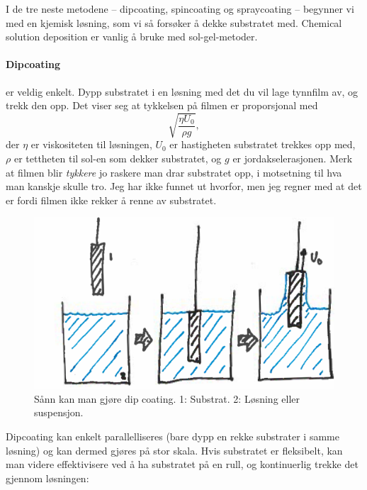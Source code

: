 I de tre neste metodene -- dipcoating, spincoating og spraycoating -- begynner vi med en kjemisk løsning, som vi så forsøker å dekke substratet med. Chemical solution deposition er vanlig å bruke med sol-gel-metoder. 

\paragraph{Dipcoating} er veldig enkelt. Dypp substratet i en løsning med det du vil lage tynnfilm av, og trekk den opp. Det viser seg at tykkelsen på filmen er proporsjonal med 
\begin{equation}
	\sqrt{\frac{\eta U_0}{\rho g}},
\end{equation}
 der $\eta$ er viskositeten til løsningen, $U_0$ er hastigheten substratet trekkes opp med, $\rho$ er tettheten til sol-en som dekker substratet, og $g$ er jordakselerasjonen. Merk at filmen blir \emph{tykkere} jo raskere man drar substratet opp, i motsetning til hva man kanskje skulle tro. Jeg har ikke funnet ut hvorfor, men jeg regner med at det er fordi filmen ikke rekker å renne av substratet.
\begin{figure}[H]
\bmd\centering
\includegraphics[width=\linewidth]{metodefigs/dipcoat.png}
\caption{Sånn kan man gjøre dip coating. 1: Substrat. 2: Løsning eller suspensjon.}
\emd\end{figure}
Dipcoating kan enkelt parallelliseres (bare dypp en rekke substrater i samme løsning) og kan dermed gjøres på stor skala. Hvis substratet er fleksibelt, kan man videre effektivisere ved å ha substratet på en rull, og kontinuerlig trekke det gjennom løsningen:
